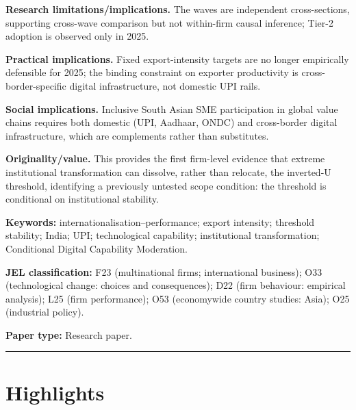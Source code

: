 \documentclass[
  12pt]{article}
\begin{document}
\textbf{Research limitations/implications.} The waves are independent
cross-sections, supporting cross-wave comparison but not within-firm
causal inference; Tier-2 adoption is observed only in 2025.

\textbf{Practical implications.} Fixed export-intensity targets are no
longer empirically defensible for 2025; the binding constraint on
exporter productivity is cross-border-specific digital infrastructure,
not domestic UPI rails.

\textbf{Social implications.} Inclusive South Asian SME participation in
global value chains requires both domestic (UPI, Aadhaar, ONDC) and
cross-border digital infrastructure, which are complements rather than
substitutes.

\textbf{Originality/value.} This provides the first firm-level evidence
that extreme institutional transformation can dissolve, rather than
relocate, the inverted-U threshold, identifying a previously untested
scope condition: the threshold is conditional on institutional
stability.

\textbf{Keywords:} internationalisation--performance; export intensity;
threshold stability; India; UPI; technological capability; institutional
transformation; Conditional Digital Capability Moderation.

\textbf{JEL classification:} F23 (multinational firms; international
business); O33 (technological change: choices and consequences); D22
(firm behaviour: empirical analysis); L25 (firm performance); O53
(economywide country studies: Asia); O25 (industrial policy).

\textbf{Paper type:} Research paper.

\begin{center}\rule{0.5\linewidth}{0.5pt}\end{center}

\hypertarget{highlights}{%
\section{Highlights}\label{highlights}}
\end{document}
